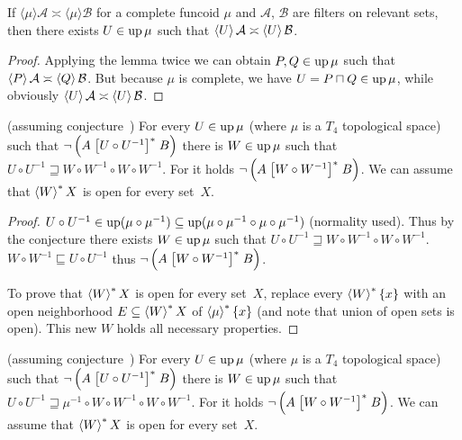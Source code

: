 \begin{cor}\label{disj-mu}
  If $\langle \mu \rangle \mathcal{A} \asymp \langle \mu \rangle
  \mathcal{B}$ for a complete funcoid $\mu$ and $\mathcal{A}$,
  $\mathcal{B}$ are filters on relevant sets, then there exists $U \in
  \operatorname{up} \mu$ such that $\left\langle U\right\rangle \mathcal{A} \asymp \left\langle U\right\rangle \mathcal{B}$.
\end{cor}

\begin{proof}
  Applying the lemma twice we can obtain $P, Q \in \operatorname{up} \mu$
  such that $\left\langle P\right\rangle \mathcal{A} \asymp \left\langle Q\right\rangle \mathcal{B}$. But because
  $\mu$ is complete, we have $U = P \sqcap Q \in \operatorname{up} \mu$,
  while obviously $\left\langle U\right\rangle \mathcal{A} \asymp \left\langle U\right\rangle \mathcal{B}$.
\end{proof}

\begin{lem}
  (assuming conjecture~) For every $U \in \operatorname{up} \mu$ (where $\mu$ is a $T_4$ topological space) such that
  $\neg \left( A \mathrel{\left[U \circ U^{- 1}\right]^{\ast}} B \right)$ there is $W \in
  \operatorname{up} \mu$ such that $U \circ U^{- 1} \sqsupseteq W \circ W^{- 1}
  \circ W \circ W^{- 1}$. For it holds $\neg \left( A \mathrel{\left[W \circ W^{-
  1}\right]^{\ast}} B \right)$.
  We can assume that $\left\langle W\right\rangle ^{\ast}X$ is open for every set~$X$.
\end{lem}

\begin{proof}
  $U \circ U^{- 1} \in \operatorname{up} (\mu \circ \mu^{- 1}) \subseteq
  \operatorname{up} (\mu \circ \mu^{- 1} \circ \mu \circ
  \mu^{- 1})$ (normality used). Thus by the conjecture there exists $W
  \in \operatorname{up} \mu$ such that $U \circ U^{- 1} \sqsupseteq W \circ W^{-
  1} \circ W \circ W^{- 1}$. $W \circ W^{- 1} \sqsubseteq U \circ U^{- 1}$
  thus $\neg \left( A \mathrel{\left[W \circ W^{- 1}\right]^{\ast}} B \right)$.
  
  To prove that $\left\langle W\right\rangle ^{\ast}X$ is open for every set~$X$, replace every $\left\langle W\right\rangle ^{\ast}\{x\}$
  with an open neighborhood $E\subseteq\left\langle W\right\rangle ^{\ast}X$ of $\left\langle \mu\right\rangle ^{\ast}\{x\}$
  (and note that union of open sets is open).
  This new $W$ holds all necessary properties.
\end{proof}

\begin{lem}
  (assuming conjecture~) For every $U \in \operatorname{up} \mu$ (where $\mu$ is a $T_4$ topological space) such that
  $\neg \left( A \mathrel{\left[U \circ U^{- 1}\right]^{\ast}} B \right)$ there is $W \in \operatorname{up}\mu$
  such that $U \circ U^{- 1} \sqsupseteq \mu^{-1} \circ W \circ W^{-1}\circ W \circ W^{- 1}$.
  For it holds $\neg \left( A \mathrel{\left[W \circ W^{-
  1}\right]^{\ast}} B \right)$.
  We can assume that $\left\langle W\right\rangle ^{\ast}X$ is open for every set~$X$.
\end{lem}

